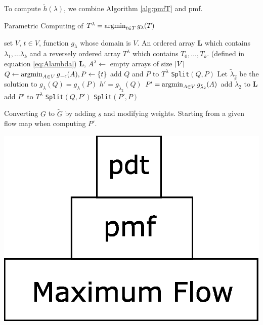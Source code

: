 \documentclass[portrait,final,a0paper,fontscale=0.3]{baposter}
\begin{document}
\begin{poster}
{\begin{multicols}{2}
To compute $\tilde{h}(\lambda)$, we combine Algorithm \ref{alg:pmfT} and \textsf{pmf}.
\begin{algorithm}[H]
	\caption{
		{\footnotesize
		Parametric Computing of $T^{\lambda} = \operatorname*{argmin}_{t\in T} g_{\lambda}(T)$
		}
	}\label{alg:pmfT}
	\begin{algorithmic}[1]
		\REQUIRE set $V$, $t \in V$, function $g_{\lambda}$ whose domain is $V$.
		\ENSURE An ordered array \textbf{L} which contains $\lambda_1, \dots \lambda_k$ and a reversely ordered array $T^{\lambda}$ which contains $T_0,\dots, T_k$. (defined in equation \eqref{eq:Alambda})
		\STATE \textbf{L}, $A^{\lambda} \leftarrow$ empty arrays of size $\lvert V\rvert$
		\STATE $Q \leftarrow \operatorname*{argmin}_{A\in V} g_{-\epsilon}(A), P \leftarrow \{ t \}$ \label{alg:uini}
		\STATE add $Q$ and $P$ to $T^{\lambda}$
		\STATE \texttt{Split}$(Q,P)$
		\STATE Let $\tilde{\lambda}_2$ be the solution to $g_{\lambda}(Q) =  g_{\lambda}(P)$
		\STATE $h' = g_{\tilde{\lambda}_2}(Q)$
		\STATE $P' =\operatorname*{argmin}_{A\in V} g_{\tilde{\lambda}_2}(A)$  \label{alg:Pap}
		\STATE add  $\tilde{\lambda}_2$ to $\mathbf{L}$
		\ELSE
		\STATE add $P'$ to $T^{\lambda}$ \label{alg:addP}
		\STATE \texttt{Split}$(Q,P')$
		\STATE \texttt{Split}$(P',P)$
		\ENDIF
		\ENDFUNCTION
	\end{algorithmic}
\end{algorithm}
{

}
\begin{multicols}{2}		
Converting $G$ to $\widetilde{G}$ by adding $s$ and modifying weights.
Starting from a given flow map when computing $P'$.

\includegraphics[width=0.65\linewidth]{img/pdt.eps}
\end{multicols}
\end{multicols}

}

\end{poster}
\end{document}
